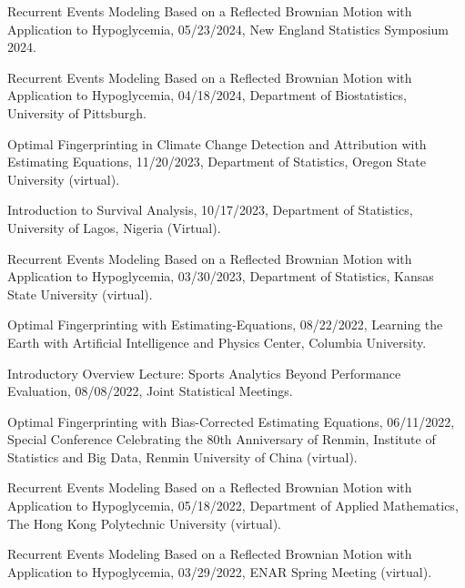 \documentclass[Statistics]{vita}
\begin{document}
\begin{vita}
\begin{Publications}
\begin{BookReviews}
  \end{BookReviews}
  \end{Publications}
  \begin{InvitedTalksLectures}
  \begin{InvitedTalks}
  \item Recurrent Events Modeling Based on a Reflected Brownian Motion with Application to Hypoglycemia, 05/23/2024, New England Statistics Symposium 2024.
  \item Recurrent Events Modeling Based on a Reflected Brownian Motion with Application to Hypoglycemia, 04/18/2024, Department of Biostatistics, University of Pittsburgh.
  \item Optimal Fingerprinting in Climate Change Detection and Attribution with Estimating Equations, 11/20/2023, Department of Statistics, Oregon State University (virtual).
  \item Introduction to Survival Analysis, 10/17/2023, Department of Statistics, University of Lagos, Nigeria (Virtual).
  \item Recurrent Events Modeling Based on a Reflected Brownian Motion with Application to Hypoglycemia, 03/30/2023, Department of Statistics, Kansas State University (virtual).
  \item Optimal Fingerprinting with Estimating-Equations, 08/22/2022, Learning the Earth with Artificial Intelligence and Physics Center, Columbia University.
  \item Introductory Overview Lecture: Sports Analytics Beyond Performance Evaluation, 08/08/2022, Joint Statistical Meetings.
  \item Optimal Fingerprinting with Bias-Corrected Estimating Equations, 06/11/2022, Special Conference Celebrating the 80th Anniversary of Renmin, Institute of Statistics and Big Data, Renmin University of China (virtual).
  \item Recurrent Events Modeling Based on a Reflected Brownian Motion with Application to Hypoglycemia, 05/18/2022, Department of Applied Mathematics, The Hong Kong Polytechnic University (virtual).
  \item Recurrent Events Modeling Based on a Reflected Brownian Motion with Application to Hypoglycemia, 03/29/2022, ENAR Spring Meeting (virtual).

\end{InvitedTalks}
\end{InvitedTalksLectures}
\end{vita}
\end{document}
